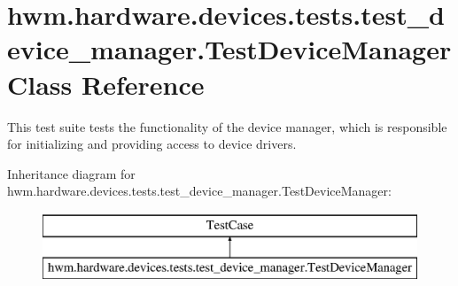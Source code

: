 \hypertarget{classhwm_1_1hardware_1_1devices_1_1tests_1_1test__device__manager_1_1_test_device_manager}{\section{hwm.\-hardware.\-devices.\-tests.\-test\-\_\-device\-\_\-manager.\-Test\-Device\-Manager Class Reference}
\label{classhwm_1_1hardware_1_1devices_1_1tests_1_1test__device__manager_1_1_test_device_manager}
}


This test suite tests the functionality of the device manager, which is responsible for initializing and providing access to device drivers.  


Inheritance diagram for hwm.\-hardware.\-devices.\-tests.\-test\-\_\-device\-\_\-manager.\-Test\-Device\-Manager\-:\begin{figure}[H]
\begin{center}
\leavevmode
\includegraphics[height=2.000000cm]{classhwm_1_1hardware_1_1devices_1_1tests_1_1test__device__manager_1_1_test_device_manager}
\end{center}
\end{figure}
